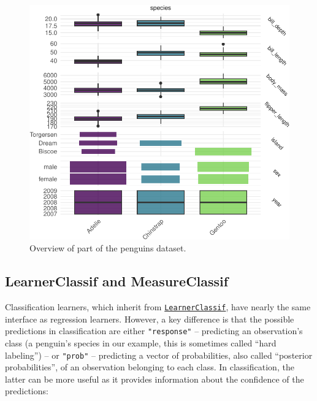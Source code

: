 \begin{figure}[H]

{\centering \includegraphics[width=1\textwidth,height=\textheight]{chapters/chapter2/data_and_basic_modeling_files/figure-pdf/fig-penguins-overview-1.pdf}

}

\caption{\label{fig-penguins-overview}Overview of part of the penguins
dataset.}

\end{figure}

\hypertarget{sec-basics-classif-learner}{%
\subsection{LearnerClassif and
MeasureClassif}\label{sec-basics-classif-learner}}

Classification learners, which inherit from
\href{https://mlr3.mlr-org.com/reference/LearnerClassif.html}{\texttt{LearnerClassif}},
have nearly the same interface as regression learners. However, a key
difference is that the possible predictions in classification are either
\texttt{"response"} -- predicting an observation's class (a penguin's
species in our example, this is sometimes called ``hard labeling'') --
or \texttt{"prob"} -- predicting a vector of probabilities, also called
``posterior probabilities'', of an observation belonging to each class.
In classification, the latter can be more useful as it provides
information about the confidence of the predictions:

